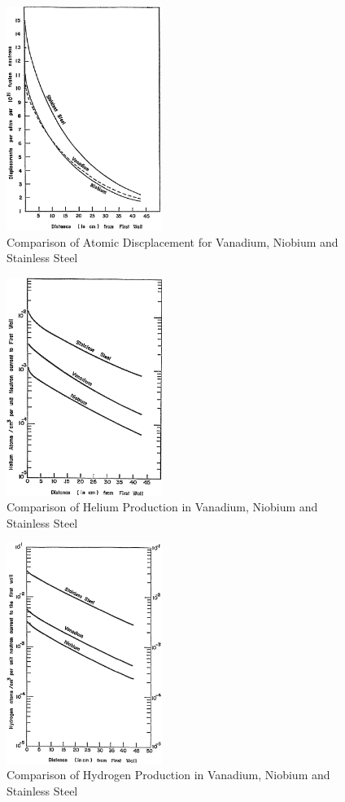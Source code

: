 \documentclass[11pt]{article}
\begin{document}
\begin{figure}[h!]
  \centering
  \includegraphics[width=0.45\textwidth]{figs/fig8.png}
  \caption{Comparison of Atomic Discplacement for Vanadium, Niobium and Stainless Steel}
\end{figure}
\begin{figure}[h!]
  \centering
  \includegraphics[width=0.45\textwidth]{figs/fig9.png}
  \caption{Comparison of Helium Production in Vanadium, Niobium and Stainless Steel}
\end{figure}
\begin{figure}[H]
  \centering
  \includegraphics[width=0.45\textwidth]{figs/fig10.png}
  \caption{Comparison of Hydrogen Production in Vanadium, Niobium and Stainless Steel}
\end{figure}
\end{document}
